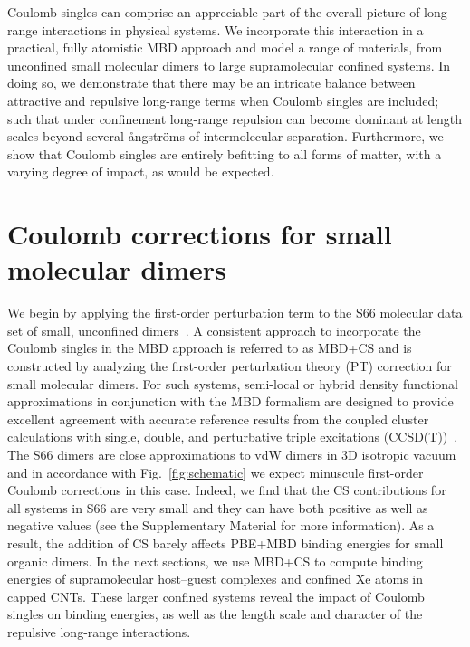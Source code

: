 \documentclass[aps,prl,groupaddress, twocolumn]{revtex4-1}  %
\begin{document}
Coulomb singles can comprise an appreciable part of the overall picture of long-range interactions in physical systems. We incorporate this interaction in a practical, fully atomistic MBD approach and model a range of materials, from unconfined small molecular dimers to large supramolecular confined systems. In doing so, we demonstrate that there may be an intricate balance between attractive and repulsive long-range terms when Coulomb singles are included; such that under confinement long-range repulsion can become dominant at length scales beyond several \r{a}ngstr\"{o}ms of intermolecular separation. Furthermore, we show that Coulomb singles are entirely befitting to all forms of matter, with a varying degree of impact, as would be expected.

\section*{Coulomb corrections for small molecular dimers}
We begin by applying the first-order perturbation term to the S66 molecular data set of small, unconfined dimers~\cite{s66X8_database}. A consistent approach to incorporate the Coulomb singles in the MBD approach is referred to as MBD+CS and is constructed by analyzing the first-order perturbation theory (PT) correction for small molecular dimers.
For such systems, semi-local or hybrid density functional approximations in conjunction with the MBD formalism are designed to provide excellent agreement with accurate reference results from the coupled cluster calculations with single, double, and perturbative triple excitations (CCSD(T))~\cite{Tkatchenko2012}.  %
The S66 dimers are close approximations to vdW dimers in 3D isotropic vacuum and in accordance with Fig.~\ref{fig:schematic} we expect minuscule first-order Coulomb corrections in this case.
Indeed, we find that the CS contributions for all systems in S66 are very small and they can have both positive as well as negative values (see the Supplementary Material for more information). As a result, the addition of CS barely affects PBE+MBD binding energies for small organic dimers.
In the next sections, we use MBD+CS to compute binding energies of supramolecular host--guest complexes and confined Xe atoms in capped CNTs. These larger confined systems reveal the impact of Coulomb singles on binding energies, as well as the length scale and character of the repulsive long-range interactions.
\end{document}
